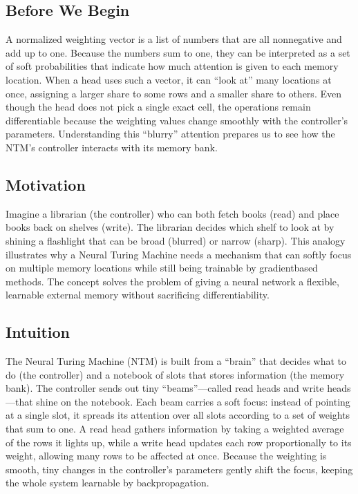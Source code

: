 \documentclass[12pt, a4paper]{article}
\begin{document}
\subsection{Before We Begin}
A normalized weighting vector is a list of numbers that are all nonnegative and add up to one.  
Because the numbers sum to one, they can be interpreted as a set of soft probabilities that indicate how much attention is given to each memory location.  
When a head uses such a vector, it can ``look at'' many locations at once, assigning a larger share to some rows and a smaller share to others.  
Even though the head does not pick a single exact cell, the operations remain differentiable because the weighting values change smoothly with the controller's parameters.  
Understanding this ``blurry'' attention prepares us to see how the NTM's controller interacts with its memory bank.

\subsection{Motivation}
Imagine a librarian (the controller) who can both fetch books (read) and place books back on shelves (write).  
The librarian decides which shelf to look at by shining a flashlight that can be broad (blurred) or narrow (sharp).  
This analogy illustrates why a Neural Turing Machine needs a mechanism that can softly focus on multiple memory locations while still being trainable by gradientbased methods.  
The concept solves the problem of giving a neural network a flexible, learnable external memory without sacrificing differentiability.

\subsection{Intuition}
The Neural Turing Machine (NTM) is built from a ``brain'' that decides what to do (the controller) and a notebook of slots that stores information (the memory bank).  
The controller sends out tiny ``beams''---called read heads and write heads---that shine on the notebook.  
Each beam carries a soft focus: instead of pointing at a single slot, it spreads its attention over all slots according to a set of weights that sum to one.  
A read head gathers information by taking a weighted average of the rows it lights up, while a write head updates each row proportionally to its weight, allowing many rows to be affected at once.  
Because the weighting is smooth, tiny changes in the controller's parameters gently shift the focus, keeping the whole system learnable by backpropagation.
\end{document}
